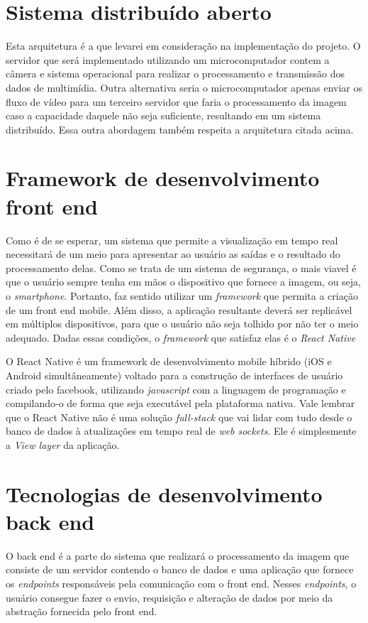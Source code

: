 \documentclass[12pt, %
openright, 
oneside, %
a4paper,    %
brazil]{facom-ufu-abntex2}
\begin{document}
\section{Sistema distribuído aberto}

Esta arquitetura é a que levarei em consideração na implementação do projeto. O
servidor que será implementado utilizando um microcomputador contem a câmera e
sistema operacional para realizar o processamento e transmissão dos dados de
multimídia. Outra alternativa seria o microcomputador apenas enviar os fluxo de
vídeo para um terceiro servidor que faria o processamento da imagem caso a
capacidade daquele não seja suficiente, resultando em um sistema distribuído.
Essa outra abordagem também respeita a arquitetura citada acima.

\section{Framework de desenvolvimento front end}

Como é de se esperar, um sistema que permite a visualização em tempo real
necessitará de um meio para apresentar ao usuário as saídas e o resultado do
processamento delas. Como se trata de um sistema de segurança, o mais viavel é
que o usuário sempre tenha em mãos o dispositivo que fornece a imagem, ou seja,
o \emph{smartphone}. Portanto, faz sentido utilizar um \emph{framework} que
permita a criação de um front end mobile. Além disso, a aplicação resultante
deverá ser replicável em múltiplos dispositivos, para que o usuário não seja
tolhido por não ter o meio adequado. Dadas essas condições, o \emph{framework}
que satisfaz elas é o \emph{React Native}

O React Native é um framework de desenvolvimento mobile híbrido (iOS e Android
simultâneamente) voltado para a construção de interfaces de usuário criado pelo
facebook, utilizando \emph{javascript} com a linguagem de programação e
compilando-o de forma que seja executável pela plataforma nativa. Vale lembrar
que o React Native não é uma solução \emph{full-stack} que vai lidar com tudo
desde o banco de dados à atualizações em tempo real de \emph{web sockets}. Ele
é simplesmente a \emph{View layer} da aplicação. \cite{boduch2017react}

\section{Tecnologias de desenvolvimento back end}

O back end é a parte do sistema que realizará o processamento da imagem que
consiste de um servidor contendo o banco de dados e uma aplicação que fornece
os \emph{endpoints} responsáveis pela comunicação com o front end. Nesses
\emph{endpoints}, o usuário consegue fazer o envio, requisição e alteração de
dados por meio da abstração fornecida pelo front end.
\end{document}
